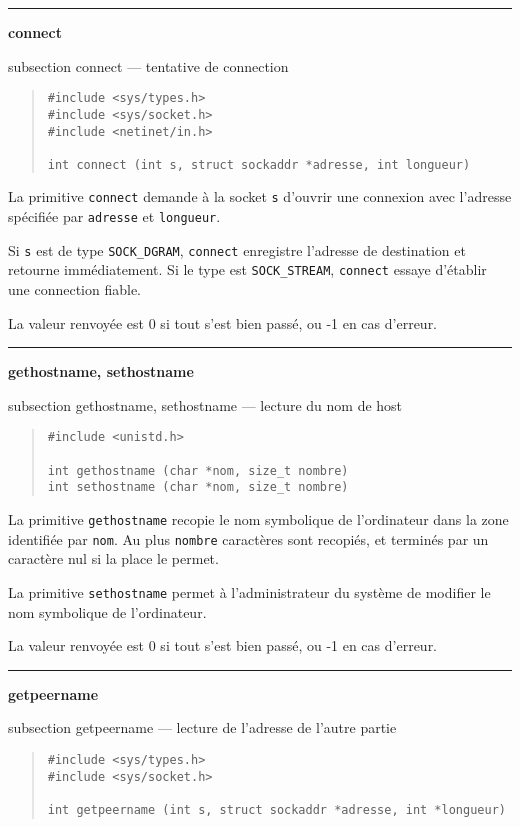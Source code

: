 \documentclass [twoside] {report}
\newcommand {\primitive} [1]
    {
	{\large \bf #1}
	\addcontentsline {toc} {subsection} {#1}
    }
\newcommand {\separation}
    {
	\vspace {7mm}
	\nopagebreak
	\hrule
    }
\begin{document}

\separation
\primitive {connect} --- tentative de connection

\begin {quote}
\begin {verbatim}
#include <sys/types.h>
#include <sys/socket.h>
#include <netinet/in.h>

int connect (int s, struct sockaddr *adresse, int longueur)
\end{verbatim}
\end {quote}

La primitive {\tt connect} demande à la socket {\tt s}
d'ouvrir une connexion avec l'adresse spécifiée par
{\tt adresse} et {\tt longueur}.

Si {\tt s} est de type {\tt SOCK\_DGRAM}, {\tt connect}
enregistre l'adresse de destination et retourne immédiatement.
Si le type est {\tt SOCK\_STREAM}, {\tt connect} essaye
d'établir une connection fiable.

La valeur renvoyée est 0 si tout s'est bien passé, ou -1 en
cas d'erreur.



\separation
\primitive {gethostname, sethostname} --- lecture du nom de host

\begin {quote}
\begin {verbatim}
#include <unistd.h>

int gethostname (char *nom, size_t nombre)
int sethostname (char *nom, size_t nombre)
\end{verbatim}
\end {quote}

La primitive {\tt gethostname} recopie le nom symbolique de
l'ordinateur dans la zone identifiée par {\tt nom}. Au
plus {\tt nombre} caractères sont recopiés, et terminés par un
caractère nul si la place le permet.

La primitive {\tt sethostname} permet à l'administrateur du système de
modifier le nom symbolique de l'ordinateur.

La valeur renvoyée est 0 si tout s'est bien passé, ou -1 en
cas d'erreur.



\separation
\primitive {getpeername} --- lecture de l'adresse de l'autre partie

\begin {quote}
\begin {verbatim}
#include <sys/types.h>
#include <sys/socket.h>

int getpeername (int s, struct sockaddr *adresse, int *longueur)
\end{verbatim}
\end {quote}
\end{document}
